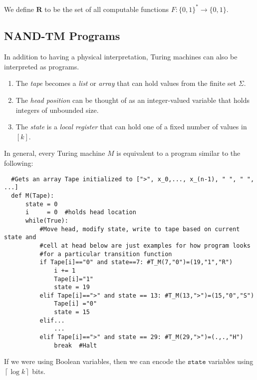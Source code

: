   \begin{definition}
    We define $\textbf{R}$ to be the set of all computable functions $F: \{0,1\}^* \longrightarrow \{0,1\}$. 
  \end{definition}

  \subsection{NAND-TM Programs}

  In addition to having a physical interpretation, Turing machines can also be interpreted as programs. 
  \begin{enumerate}
      \item The \textit{tape} becomes a \textit{list} or \textit{array} that can hold values from the finite set $\Sigma$. 
      \item The \textit{head position} can be thought of as an integer-valued variable that holds integers of unbounded size. 
      \item The \textit{state} is a \textit{local register} that can hold one of a fixed number of values in $[k]$. 
  \end{enumerate}
  In general, every Turing machine $M$ is equivalent to a program similar to the following: 
  \begin{lstlisting}
  #Gets an array Tape initialized to [">", x_0,..., x_(n-1), " ", " ", ...]
  def M(Tape): 
      state = 0
      i     = 0  #holds head location
      while(True): 
          #Move head, modify state, write to tape based on current state and 
          #cell at head below are just examples for how program looks 
          #for a particular transition function
          if Tape[i]=="0" and state==7: #T_M(7,"0")=(19,"1","R") 
              i += 1
              Tape[i]="1"
              state = 19
          elif Tape[i]==">" and state == 13: #T_M(13,">")=(15,"0","S")
              Tape[i] ="0"
              state = 15
          elif... 
              ...
          elif Tape[i]==">" and state == 29: #T_M(29,">")=(.,.,"H")
              break  #Halt
  \end{lstlisting}
  If we were using Boolean variables, then we can encode the $\texttt{state}$ variables using $\left\lceil{\log k}\right\rceil$ bits. 

